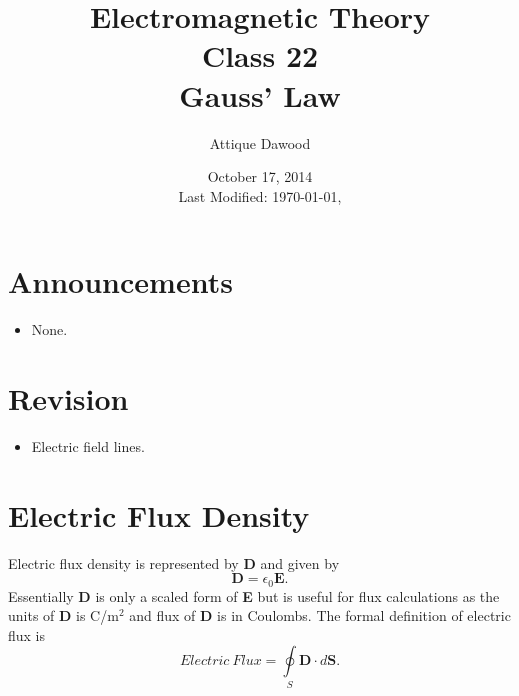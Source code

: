 \documentclass[12pt,a4paper]{article}
\title{Electromagnetic Theory\\Class 22\\Gauss' Law}
\author{Attique Dawood}
\date{October 17, 2014\\[0.2cm] Last Modified: \today, \currenttime}
\begin{document}
\maketitle
\section{Announcements}
\begin{itemize}
\item None.
\end{itemize}
\section{Revision}
\begin{itemize}
\item Electric field lines.
\end{itemize}
\section{Electric Flux Density}
Electric flux density is represented by \textbf{D} and given by
\begin{equation}
\mathrm{\textbf{D}}=\epsilon_0\mathrm{\textbf{E}}.
\end{equation}
Essentially \textbf{D} is only a scaled form of \textbf{E} but is useful for flux calculations as the units of \textbf{D} is C/m$^2$ and flux of \textbf{D} is in Coulombs. The formal definition of electric flux is
\begin{equation}
Electric~Flux = \oint\limits_{S}\textbf{D}\cdot d\textbf{S}.
\end{equation}
\end{document}
